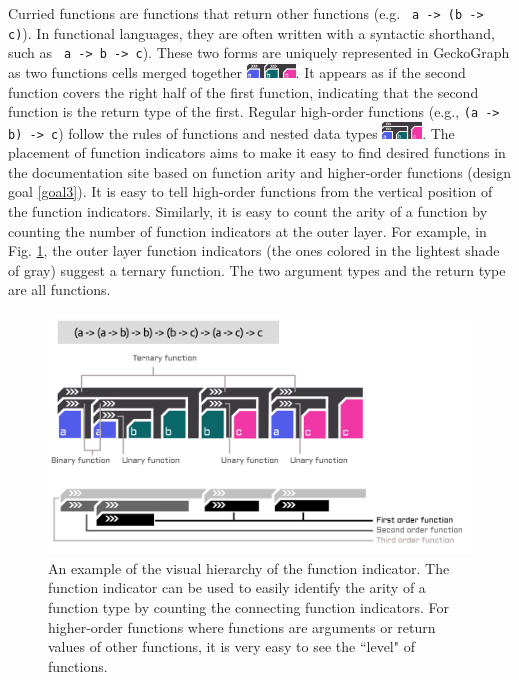 \documentclass[preprint,12pt]{elsarticle}
\begin{document}
Curried functions are functions that return other functions (e.g. \texttt{ a -> (b -> c)}). In functional languages, they are often written with a syntactic shorthand, such as \texttt{ a -> b -> c}). These two forms are uniquely represented in GeckoGraph as two functions cells merged together \includegraphics[height=1em]{figures/Curry.png}. It appears as if the second function covers the right half of the first function, indicating that the second function is the return type of the first. Regular high-order functions (e.g., \texttt{(a -> b) -> c}) follow the rules of functions and nested data types \includegraphics[height=1.2em]{figures/HOF.png}. The placement of function indicators aims to make it easy to find desired functions in the documentation site based on function arity and higher-order functions (design goal \ref{goal3}). It is easy to tell high-order functions from the vertical position of the function indicators. Similarly, it is easy to count the arity of a function by counting the number of function indicators at the outer layer. For example, in Fig. \ref{fig:indicator}, the outer layer function indicators (the ones colored in the lightest shade of gray) suggest a ternary function. The two argument types and the return type are all functions.

\begin{figure}[h]
  \includegraphics[width=\linewidth]{figures/Indicator}
  \caption{
        \label{fig:indicator}
        An example of the visual hierarchy of the function indicator. The function indicator can be used to easily identify the arity of a function type by counting the connecting function indicators. For higher-order functions where functions are arguments or return values of other functions, it is very easy to see the ``level" of functions. 
  }
\end{figure}
\end{document}

